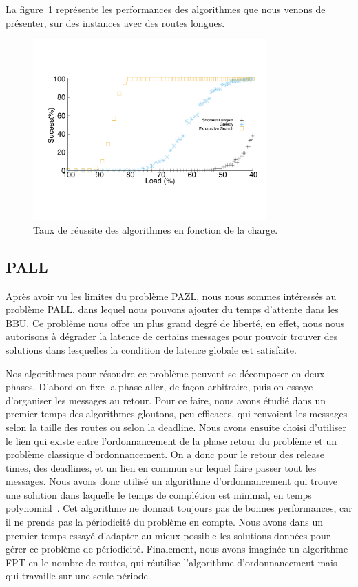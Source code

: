 \documentclass{article}
\begin{document}
 La figure~\ref{fig:long} représente les performances des algorithmes que nous venons de présenter, sur des instances avec des routes longues.
\begin{figure}[h]

       \begin{center}
      \includegraphics[width=0.8\textwidth]{echec_longues.pdf}
      \end{center}
       
      \caption{Taux de réussite des algorithmes en fonction de la charge.}\label{fig:long}
     \end{figure}
     
\subsection{PALL}
Après avoir vu les limites du problème PAZL, nous nous sommes intéressés au problème PALL, dans lequel nous pouvons ajouter du temps d'attente dans les BBU. Ce problème nous offre un plus grand degré de liberté, en effet, nous nous autorisons à dégrader la latence de certains messages pour pouvoir trouver des solutions dans lesquelles la condition de latence globale est satisfaite.

Nos algorithmes pour résoudre ce problème peuvent se décomposer en deux phases. D'abord on fixe la phase aller, de façon arbitraire, puis on essaye d'organiser les messages au retour.
Pour ce faire, nous avons étudié dans un premier temps des algorithmes gloutons, peu efficaces, qui renvoient les messages selon la taille des routes ou selon la deadline. Nous avons ensuite choisi d'utiliser le lien qui existe entre l'ordonnancement de la phase retour du problème et un problème classique d'ordonnancement. On a donc pour le retour des release times, des deadlines, et un lien en commun sur lequel faire passer tout les messages. Nous avons donc utilisé un algorithme d'ordonnancement qui trouve une solution dans laquelle le temps de complétion est minimal, en temps polynomial~\cite{simons1978fast}. Cet algorithme ne donnait toujours pas de bonnes performances, car il ne prends pas la périodicité du problème en compte. Nous avons dans un premier temps essayé d'adapter au mieux possible les solutions données pour gérer ce problème de périodicité. Finalement, nous avons imaginée un algorithme FPT en le nombre de routes, qui réutilise l'algorithme d'ordonnancement mais qui travaille sur une seule période.
\end{document}
